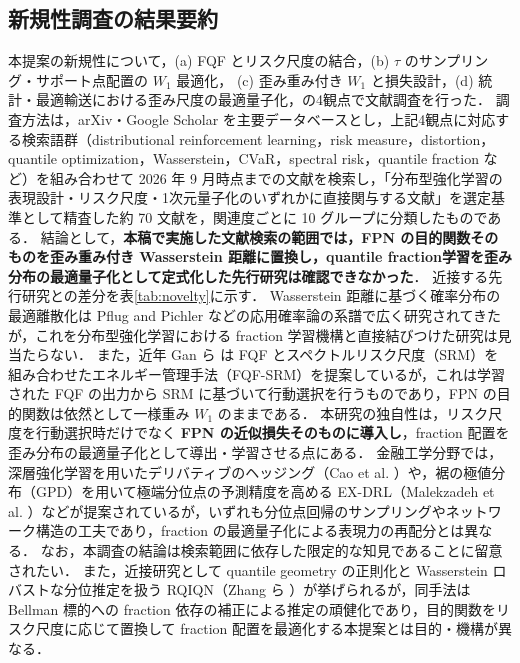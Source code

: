 \documentclass[a4paper,10pt]{jsarticle}
\theoremstyle{definition}
\newcommand{\Wone}{W_1}
\begin{document}
\subsection{新規性調査の結果要約}
本提案の新規性について，(a) FQF とリスク尺度の結合，(b) $\tau$ のサンプリング・サポート点配置の $\Wone$ 最適化，
(c) 歪み重み付き $\Wone$ と損失設計，(d) 統計・最適輸送における歪み尺度の最適量子化，の4観点で文献調査を行った．
調査方法は，arXiv・Google Scholar を主要データベースとし，上記4観点に対応する検索語群（distributional reinforcement learning，risk measure，distortion，quantile optimization，Wasserstein，CVaR，spectral risk，quantile fraction など）を組み合わせて 2026 年 9 月時点までの文献を検索し，「分布型強化学習の表現設計・リスク尺度・1次元量子化のいずれかに直接関与する文献」を選定基準として精査した約 70 文献を，関連度ごとに 10 グループに分類したものである．
結論として，\textbf{本稿で実施した文献検索の範囲では，FPN の目的関数そのものを歪み重み付き Wasserstein 距離に置換し，quantile fraction学習を歪み分布の最適量子化として定式化した先行研究は確認できなかった}．
近接する先行研究との差分を表\ref{tab:novelty}に示す．
Wasserstein 距離に基づく確率分布の最適離散化は Pflug and Pichler \cite{pflug2014multistage} などの応用確率論の系譜で広く研究されてきたが，これを分布型強化学習における fraction 学習機構と直接結びつけた研究は見当たらない．
また，近年 Gan ら \cite{gan2026energy} は FQF とスペクトルリスク尺度（SRM）を組み合わせたエネルギー管理手法（FQF-SRM）を提案しているが，これは学習された FQF の出力から SRM に基づいて行動選択を行うものであり，FPN の目的関数は依然として一様重み $W_1$ のままである．
本研究の独自性は，リスク尺度を行動選択時だけでなく \textbf{FPN の近似損失そのものに導入し}，fraction 配置を歪み分布の最適量子化として導出・学習させる点にある．
金融工学分野では，深層強化学習を用いたデリバティブのヘッジング（Cao et al. \cite{cao2021deep,cao2023gamma}）や，裾の極値分布（GPD）を用いて極端分位点の予測精度を高める EX-DRL（Malekzadeh et al. \cite{malekzadeh2024exdrl}）などが提案されているが，いずれも分位点回帰のサンプリングやネットワーク構造の工夫であり，fraction の最適量子化による表現力の再配分とは異なる．
なお，本調査の結論は検索範囲に依存した限定的な知見であることに留意されたい．
また，近接研究として quantile geometry の正則化と Wasserstein ロバストな分位推定を扱う RQIQN（Zhang ら \cite{zhang2026rqiqn}）が挙げられるが，同手法は Bellman 標的への fraction 依存の補正による推定の頑健化であり，目的関数をリスク尺度に応じて置換して fraction 配置を最適化する本提案とは目的・機構が異なる．
\end{document}
